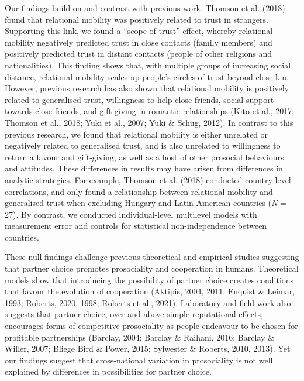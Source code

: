 \documentclass[
  man,floatsintext]{apa6}
\begin{document}
Our findings build on and contrast with previous work. Thomson et al. (2018) found that relational mobility was positively related to trust in strangers. Supporting this link, we found a ``scope of trust'' effect, whereby relational mobility negatively predicted trust in close contacts (family members) and positively predicted trust in distant contacts (people of other religions and nationalities). This finding shows that, with multiple groups of increasing social distance, relational mobility scales up people's circles of trust beyond close kin. However, previous research has also shown that relational mobility is positively related to generalised trust, willingness to help close friends, social support towards close friends, and gift-giving in romantic relationships (Kito et al., 2017; Thomson et al., 2018; Yuki et al., 2007; Yuki \& Schug, 2012). In contrast to this previous research, we found that relational mobility is either unrelated or negatively related to generalised trust, and is also unrelated to willingness to return a favour and gift-giving, as well as a host of other prosocial behaviours and attitudes. These differences in results may have arisen from differences in analytic strategies. For example, Thomson et al. (2018) conducted country-level correlations, and only found a relationship between relational mobility and generalised trust when excluding Hungary and Latin American countries (\emph{N} = 27). By contrast, we conducted individual-level multilevel models with measurement error and controls for statistical non-independence between countries.

These null findings challenge previous theoretical and empirical studies suggesting that partner choice promotes prosociality and cooperation in humans. Theoretical models show that introducing the possibility of partner choice creates conditions that favour the evolution of cooperation (Aktipis, 2004, 2011; Enquist \& Leimar, 1993; Roberts, 2020, 1998; Roberts et al., 2021). Laboratory and field work also suggests that partner choice, over and above simple reputational effects, encourages forms of competitive prosociality as people endeavour to be chosen for profitable partnerships (Barclay, 2004; Barclay \& Raihani, 2016; Barclay \& Willer, 2007; Bliege Bird \& Power, 2015; Sylwester \& Roberts, 2010, 2013). Yet our findings suggest that cross-national variation in prosociality is not well explained by differences in possibilities for partner choice.
\end{document}
